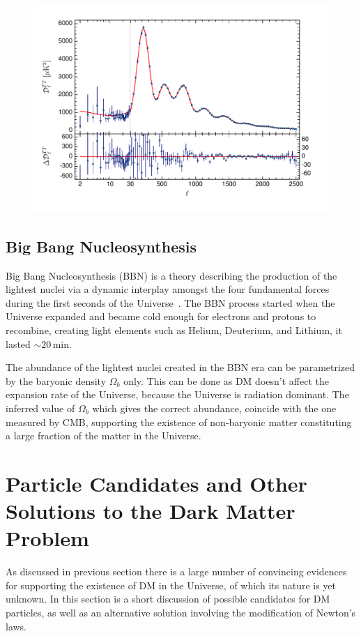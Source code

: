 \begin{figure}[]
	\centering
	\includegraphics[width=\textwidth]{figs/planck.pdf}
	\label{fig:CMB}
\end{figure}  
  
\subsection{Big Bang Nucleosynthesis}
\label{subsec:BBN}
Big Bang Nucleosynthesis (BBN) is a theory describing the production of the lightest nuclei via a dynamic interplay amongst the four fundamental forces during the first seconds of the Universe~\cite{Jedamzik:2009uy}. The BBN process started when the Universe expanded and became cold enough for electrons and protons to recombine, creating light elements such as Helium, Deuterium, and Lithium, it lasted $\sim20$\,min.

The abundance of the lightest nuclei created in the BBN era can be parametrized by the baryonic density $\Omega_b$ only. This can be done as DM doesn't affect      the expansion rate of the Universe, because the Universe is radiation dominant. The inferred value of $\Omega_b$ which gives the correct abundance, coincide with the one measured by CMB, supporting the existence of non-baryonic matter constituting a large fraction of the matter in the Universe. 
\section{Particle Candidates and Other Solutions to the Dark Matter Problem }
As discussed in previous section there is a large number of convincing evidences for supporting the existence of DM in the Universe, of which its nature is yet unknown. In this section is a short discussion of possible candidates for DM particles, as well as an alternative solution involving the modification of Newton's laws.

